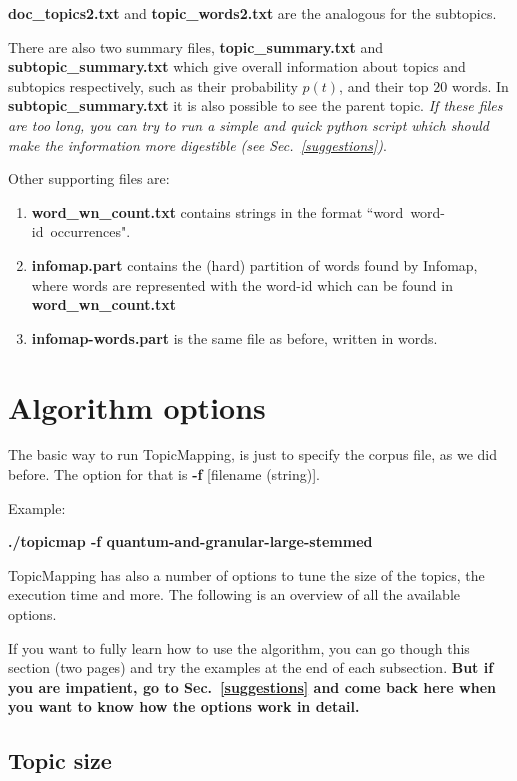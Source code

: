 \documentclass[11pt]{article}
\begin{document}
\textbf{doc\_topics2.txt} and \textbf{topic\_words2.txt} are the analogous for the subtopics.

There are also two summary files, \textbf{topic\_summary.txt} and  \textbf{subtopic\_summary.txt} which give overall information about topics and subtopics respectively, such as their probability $p(t)$,  and their top $20$ words. In \textbf{subtopic\_summary.txt} it is also possible to see the parent topic.
\textit{If these files are too long, you can try to run a simple and quick python script which should make the information more digestible (see Sec.~\ref{suggestions})}.

Other supporting files are:
\begin{enumerate}
\item \textbf{word\_wn\_count.txt} contains strings in the format ``word~word-id~occurrences".
\item \textbf{infomap.part} contains the (hard) partition of words found by Infomap, where words are represented with the word-id which can be found in  \textbf{word\_wn\_count.txt}
\item \textbf{infomap-words.part} is the same file as before, written in words.
\end{enumerate}


\section{Algorithm options}

The basic way to run TopicMapping, is just to specify the corpus file, as we did before. The option for that is \textbf{-f} [filename (string)].


Example:

\textbf{./topicmap -f quantum-and-granular-large-stemmed }


TopicMapping has also a number of options to tune the size of the topics, the execution time and more. The following is an overview of all the available options. %
 
If you want to fully learn how to use the algorithm, you can go though this section (two pages) and try the examples at the end of each subsection. 
\textbf{But if you are impatient, go to Sec.~\ref{suggestions} and come back here when you want to know how the options work in detail.}

\subsection{Topic size}
\end{document}
